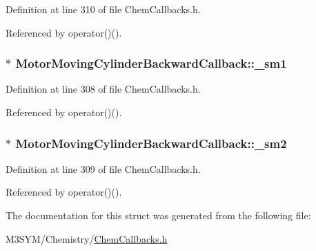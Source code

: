 Definition at line 310 of file Chem\+Callbacks.\+h.



Referenced by operator()().

\hypertarget{structMotorMovingCylinderBackwardCallback_a6276bf072dba76305dd80c9f2a70a863}{
\subsubsection[{\+\_\+sm1}]{$\ast$ Motor\+Moving\+Cylinder\+Backward\+Callback\+::\+\_\+sm1}}\label{structMotorMovingCylinderBackwardCallback_a6276bf072dba76305dd80c9f2a70a863}


Definition at line 308 of file Chem\+Callbacks.\+h.



Referenced by operator()().

\hypertarget{structMotorMovingCylinderBackwardCallback_ad4173f22f03705f8ba10fc7ff1891fa1}{
\subsubsection[{\+\_\+sm2}]{$\ast$ Motor\+Moving\+Cylinder\+Backward\+Callback\+::\+\_\+sm2}}\label{structMotorMovingCylinderBackwardCallback_ad4173f22f03705f8ba10fc7ff1891fa1}


Definition at line 309 of file Chem\+Callbacks.\+h.



Referenced by operator()().



The documentation for this struct was generated from the following file\+:\begin{DoxyCompactItemize}
\item 
M3\+S\+Y\+M/\+Chemistry/\hyperlink{ChemCallbacks_8h}{Chem\+Callbacks.\+h}\end{DoxyCompactItemize}
